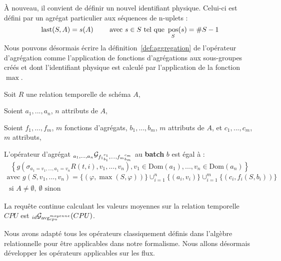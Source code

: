 À nouveau, il convient de définir un nouvel identifiant physique. Celui-ci est défini par un agrégat particulier aux séquences de n-uplets : 
$$\mathrm{last}(S,A) = s(A) \qquad \textrm{ avec } s\in S \textrm{ tel que }\mathop{\mathrm{pos}}_{S}(s) = \#S-1$$
Nous pouvons désormais écrire la définition~\ref{def:aggregation} de l'opérateur d'agrégation comme l'application de fonctions d'agrégations aux sous-groupes créés et dont l'identifiant physique est calculé par l'application de la fonction $\max$.
\begin{defi}\label{def:aggregation}
    Soit $R$ une relation temporelle de schéma $A$,

    Soient $a_1,...,a_n$, $n$ attributs de $A$,

    Soient $f_1,...,f_m$, $m$ fonctions d'agrégats, $b_1,...,b_m$, $m$ attributs de $A$, et $c_1,...,c_m$, $m$ attributs,

    L'opérateur d'agrégat $_{a_1,...,a_n}\mathcal{G}_{{f_1}_{b_1}^{c_1},...,{f_m}_{b_m}^{c_m}}$ au \textbf{batch} $b$ est égal à :
$$\left\{g(\sigma_{a_1=v_1,...,a_1=v_n} R(t,i),v_1,...,v_n), v_1 \in \mathrm{Dom}(a_1), ..., v_n \in \mathrm{Dom}(a_n)\right\} $$
$$\begin{array}{c}\textrm{avec } g(S,v_1,...,v_n) = \{(\varphi,\max(S,\varphi))\}\cup_{i=1}^n \{(a_i, v_i)\} \cup_{i=1}^m \{(c_i,f_i(S,b_i))\}\\ \textrm{ si } A \neq \emptyset,\ \emptyset\textrm{ sinon}\end{array}$$
\end{defi}

\begin{example}
    La requête continue calculant les valeurs moyennes sur la relation temporelle $CPU$ est $_{id}\mathcal{G}_{\mathrm{avg}_{cpu}^{moyenne}}(CPU)$.
\end{example}

Nous avons adapté tous les opérateurs classiquement définis dans l'algèbre relationnelle pour être applicables dans notre formalisme. Nous allons désormais développer les opérateurs applicables sur les flux.
